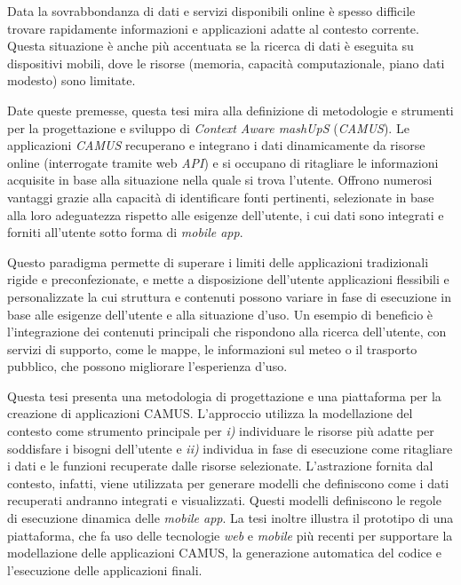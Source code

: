Data la sovrabbondanza di dati e servizi disponibili online è spesso difficile trovare rapidamente informazioni e applicazioni adatte al contesto corrente. Questa situazione è anche più accentuata se la ricerca di dati è eseguita su dispositivi mobili, dove le risorse (memoria, capacità computazionale, piano dati modesto) sono limitate.

Date queste premesse, questa tesi mira alla definizione di metodologie e strumenti per la progettazione e sviluppo di \emph{Context Aware mashUpS} (\emph{CAMUS}). Le applicazioni \emph{CAMUS} recuperano e integrano i dati dinamicamente da  risorse online (interrogate tramite web \emph{API}) e si occupano di ritagliare le informazioni acquisite in base alla situazione nella quale si trova l'utente. Offrono numerosi vantaggi grazie alla capacità di identificare fonti pertinenti, selezionate in base alla loro adeguatezza rispetto alle esigenze dell'utente, i cui dati sono integrati e forniti all'utente sotto forma di \emph{mobile app}.

Questo paradigma permette di superare i limiti delle applicazioni tradizionali rigide e preconfezionate, e mette a disposizione dell'utente applicazioni flessibili e personalizzate la cui struttura e contenuti possono variare in fase di esecuzione in base alle esigenze dell'utente e alla situazione d'uso. Un esempio di beneficio è l'integrazione dei contenuti principali che rispondono alla ricerca dell'utente, con servizi di supporto, come le mappe, le informazioni sul meteo o il trasporto pubblico, che possono migliorare l'esperienza d'uso.

Questa tesi presenta una metodologia di progettazione e una piattaforma per la creazione di applicazioni CAMUS. L'approccio utilizza la modellazione del contesto come strumento principale per  \emph{i)} individuare le risorse più adatte per soddisfare i bisogni dell'utente e \emph{ii)} individua in fase di esecuzione come ritagliare i dati e le funzioni recuperate dalle risorse selezionate. L'astrazione fornita dal contesto, infatti, viene utilizzata per generare modelli che definiscono come i dati recuperati andranno integrati e visualizzati. Questi modelli definiscono le regole di esecuzione dinamica delle \emph{mobile app}. La tesi inoltre illustra il prototipo di una piattaforma, che fa uso delle tecnologie \emph{web} e \emph{mobile} più recenti per supportare la modellazione delle applicazioni CAMUS, la generazione automatica del codice e l'esecuzione delle applicazioni finali.